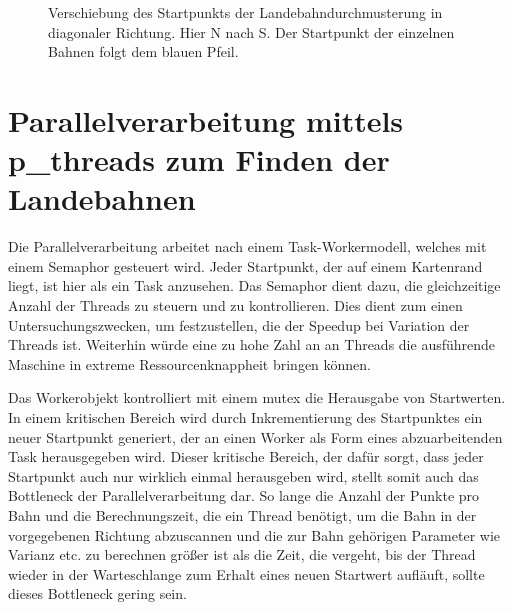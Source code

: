 \documentclass[10pt,a4paper]{report}
\begin{document}
\begin{figure}\label{scanortho}
\centering
{}
\caption{Verschiebung des Startpunkts der Landebahndurchmusterung in diagonaler Richtung. Hier N nach S. Der Startpunkt der einzelnen Bahnen folgt dem blauen Pfeil.}
\end{figure}
\section{Parallelverarbeitung mittels p\_threads zum Finden der Landebahnen}

Die Parallelverarbeitung arbeitet nach einem Task-Workermodell, welches mit einem Semaphor gesteuert wird. Jeder Startpunkt, der auf einem Kartenrand liegt, ist hier als ein Task anzusehen. Das Semaphor dient dazu, die gleichzeitige Anzahl der Threads zu steuern und zu kontrollieren. Dies dient zum einen Untersuchungszwecken, um festzustellen, die der Speedup bei Variation der Threads ist. Weiterhin würde eine zu hohe Zahl an an Threads die ausführende Maschine in extreme Ressourcenknappheit bringen können.

Das Workerobjekt kontrolliert mit einem mutex die Herausgabe von Startwerten. In einem kritischen Bereich wird durch Inkrementierung des Startpunktes ein neuer Startpunkt generiert, der an einen Worker als Form eines abzuarbeitenden Task herausgegeben wird. Dieser kritische Bereich, der dafür sorgt, dass jeder Startpunkt auch nur wirklich einmal herausgeben wird, stellt somit auch das Bottleneck der Parallelverarbeitung dar. So lange die Anzahl der Punkte pro Bahn und die Berechnungszeit, die ein Thread benötigt, um die Bahn in der vorgegebenen Richtung abzuscannen und die zur Bahn gehörigen Parameter wie Varianz etc. zu berechnen größer ist als die Zeit, die vergeht, bis der Thread wieder in der Warteschlange zum Erhalt eines neuen Startwert aufläuft, sollte dieses Bottleneck gering sein.
\end{document}
